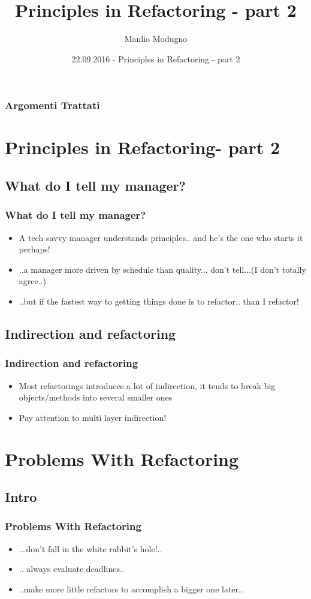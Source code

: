 \documentclass{beamer}
\title{Principles in Refactoring - part 2}
\author{Manlio Modugno}
\institute[GMTechnologies]
\date[22.09.2016] 
{22.09.2016 - Principles in Refactoring - part 2}
\begin{document}
\begin{frame}
  \titlepage
\end{frame}

\begin{frame}
  \frametitle{Argomenti Trattati}
  \tableofcontents
\end{frame}

\section{Principles in Refactoring- part 2}
\subsection{What do I tell my manager?}
\begin{frame}
  \frametitle{What do I tell my manager?}
  \begin{itemize}
	\item<+-> A tech savvy manager understands principles.. and he's the one who starts it perhaps!
	\item<+-> ..a manager more driven by schedule than quality... don't tell...(I don't totally agree..) 
	\item<+-> ..but if the fastest way to getting things done is to refactor.. than I refactor!
  \end{itemize}
\end{frame}

\subsection{Indirection and refactoring}
\begin{frame}
  \frametitle{Indirection and refactoring}
  \begin{itemize}
	\item<+-> Most refactorings introduces a lot of indirection, it tends to break big objects/methods into several smaller ones 
	\item<+-> Pay attention to multi layer indirection!
  \end{itemize}
\end{frame}

\section{Problems With Refactoring}
\subsection{Intro}
\begin{frame}
  \frametitle{Problems With Refactoring} 
  \begin{itemize}
  		\item<+-> ...don't fall in the white rabbit's hole!..
  		\item<+-> .. always evaluate deadlines.. 
  		\item<+-> ..make more little refactors to accomplish a bigger one later..
  \end{itemize}
\end{frame}
\end{document}
